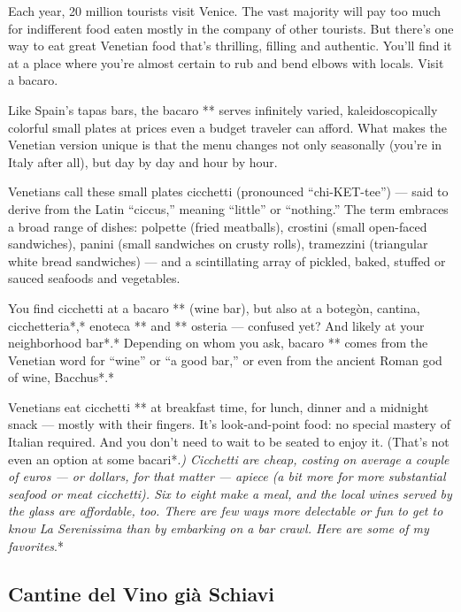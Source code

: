 Each year, 20 million tourists visit Venice. The vast majority will pay
too much for indifferent food eaten mostly in the company of other
tourists. But there's one way to eat great Venetian food that's
thrilling, filling and authentic. You'll find it at a place where you're
almost certain to rub and bend elbows with locals. Visit a bacaro.

Like Spain's tapas bars, the bacaro ** serves infinitely varied,
kaleidoscopically colorful small plates at prices even a budget traveler
can afford. What makes the Venetian version unique is that the menu
changes not only seasonally (you're in Italy after all), but day by day
and hour by hour.

Venetians call these small plates cicchetti (pronounced ``chi-KET-tee'')
--- said to derive from the Latin ``ciccus,'' meaning ``little'' or
``nothing.'' The term embraces a broad range of dishes: polpette (fried
meatballs), crostini (small open-faced sandwiches), panini (small
sandwiches on crusty rolls), tramezzini (triangular white bread
sandwiches) --- and a scintillating array of pickled, baked, stuffed or
sauced seafoods and vegetables.

You find cicchetti at a bacaro ** (wine bar), but also at a botegòn,
cantina, cicchetteria*,* enoteca ** and ** osteria --- confused yet? And
likely at your neighborhood bar*.* Depending on whom you ask, bacaro **
comes from the Venetian word for ``wine'' or ``a good bar,'' or even
from the ancient Roman god of wine, Bacchus*.*

Venetians eat cicchetti ** at breakfast time, for lunch, dinner and a
midnight snack --- mostly with their fingers. It's look-and-point food:
no special mastery of Italian required. And you don't need to wait to be
seated to enjoy it. (That's not even an option at some bacari*.\emph{)
Cicchetti are cheap, costing on average a couple of euros --- or
dollars, for that matter --- apiece (a bit more for more substantial
seafood or meat cicchetti). Six to eight make a meal, and the local
wines served by the glass are affordable, too. There are few ways more
delectable or fun to get to know La Serenissima than by embarking on a
bar crawl. Here are some of my favorites}.*

\hypertarget{cantine-del-vino-giuxe0-schiavi}{%
\subsection{Cantine del Vino già
Schiavi}\label{cantine-del-vino-giuxe0-schiavi}}

